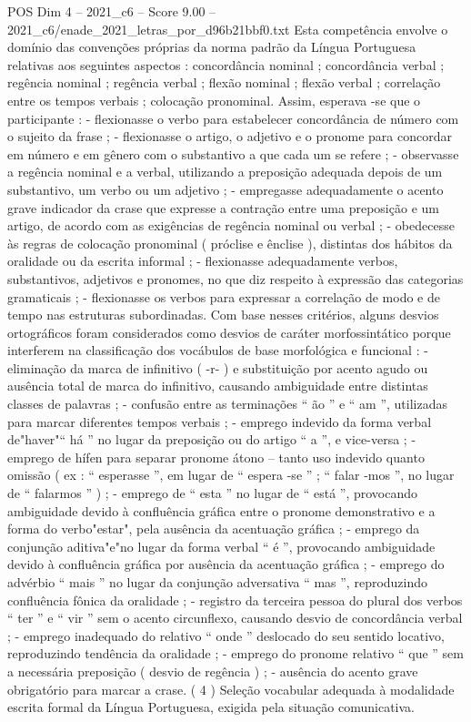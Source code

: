 \begin{textsample}{POS Dim 4 – 2021\_c6 – Score 9.00 – 2021\_c6/enade\_2021\_letras\_por\_d96b21bbf0.txt}
Esta competência envolve o domínio das convenções próprias da norma padrão da Língua Portuguesa relativas aos seguintes aspectos : concordância nominal ; concordância verbal ; regência nominal ; regência verbal ; flexão nominal ; flexão verbal ; correlação entre os tempos verbais ; colocação pronominal.
Assim, esperava -se que o participante : - flexionasse o verbo para estabelecer concordância de número com o sujeito da frase ; - flexionasse o artigo, o adjetivo e o pronome para concordar em número e em gênero com o substantivo a que cada um se refere ; - observasse a regência nominal e a verbal, utilizando a preposição adequada depois de um substantivo, um verbo ou um adjetivo ; - empregasse adequadamente o acento grave indicador da crase que expresse a contração entre uma preposição e um artigo, de acordo com as exigências de regência nominal ou verbal ; - obedecesse às regras de colocação pronominal ( próclise e ênclise ), distintas dos hábitos da oralidade ou da escrita informal ; - flexionasse adequadamente verbos, substantivos, adjetivos e pronomes, no que diz respeito à expressão das categorias gramaticais ; - flexionasse os verbos para expressar a correlação de modo e de tempo nas estruturas subordinadas.
Com base nesses critérios, alguns desvios ortográficos foram considerados como desvios de caráter morfossintático porque interferem na classificação dos vocábulos de base morfológica e funcional : - eliminação da marca de infinitivo ( -r- ) e substituição por acento agudo ou ausência total de marca do infinitivo, causando ambiguidade entre distintas classes de palavras ; - confusão entre as terminações “ ão ” e “ am ”, utilizadas para marcar diferentes tempos verbais ; - emprego indevido da forma verbal de"haver"“ há ” no lugar da preposição ou do artigo “ a ”, e vice-versa ; - emprego de hífen para separar pronome átono – tanto uso indevido quanto omissão ( ex : “ esperasse ”, em lugar de “ espera -se ” ; “ falar -mos ”, no lugar de “ falarmos ” ) ; - emprego de “ esta ” no lugar de “ está ”, provocando ambiguidade devido à confluência gráfica entre o pronome demonstrativo e a forma do verbo"estar", pela ausência da acentuação gráfica ; - emprego da conjunção aditiva"e"no lugar da forma verbal “ é ”, provocando ambiguidade devido à confluência gráfica por ausência da acentuação gráfica ; - emprego do advérbio “ mais ” no lugar da conjunção adversativa “ mas ”, reproduzindo confluência fônica da oralidade ; - registro da terceira pessoa do plural dos verbos “ ter ” e “ vir ” sem o acento circunflexo, causando desvio de concordância verbal ; - emprego inadequado do relativo “ onde ” deslocado do seu sentido locativo, reproduzindo tendência da oralidade ; - emprego do pronome relativo “ que ” sem a necessária preposição ( desvio de regência ) ; - ausência do acento grave obrigatório para marcar a crase. ( 4 ) Seleção vocabular adequada à modalidade escrita formal da Língua Portuguesa, exigida pela situação comunicativa.

\end{textsample}
